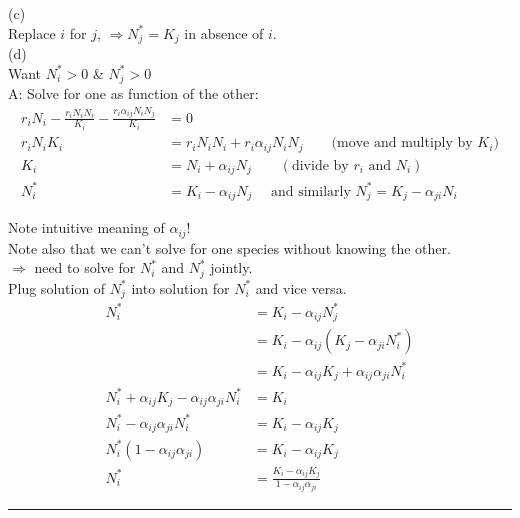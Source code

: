 \documentclass{article}
\newcommand{\ind}{\-\hspace{1cm}}
\begin{document}
(c)\\
Replace $i$ for $j$, $\Rightarrow N_j^* = K_j$ in absence of $i$.\\

(d)\\
Want $N_i^* > 0$ \&  $N_j^* > 0$\\
A: Solve for one as function of the other:\\
\begin{align*}
	r_i N_i - \frac{r_i N_i N_i}{K_i} - \frac{ r_i \alpha_{ij} N_i N_j}{K_i} & =0\\
	r_i N_i K_i & = r_i N_i N_i + r_i \alpha_{ij} N_i N_j   \quad \quad \text{(move and  multiply by }K_i)\\
	K_i & = N_i + \alpha_{ij}N_j  \quad \quad (\text{divide by } r_i \text{  and } N_i)\\[1em]
	N_i^* & = K_i - \alpha_{ij} N_j  \quad \text{ and similarly }	N_j^* = K_j - \alpha_{ji} N_i
 \end{align*}
 
Note intuitive meaning of $\alpha_{ij}$!\\
Note also that we can't solve for one species without knowing the other.\\
\ind $\Rightarrow$ need to solve for $N_i^*$ and $N_j^*$ jointly.\\
\ind Plug solution of $N_j^*$ into solution for $N_i^*$ and vice versa.
\begin{align*}
	N_i^*  & = K_i - \alpha_{ij} N_j^* \\
				& = K_i - \alpha_{ij} \left ( K_j  - \alpha_{ji} N_i^* \right )\\
				& = K_i - \alpha_{ij} K_j + \alpha_{ij}\alpha_{ji} N_i^* \\
	N_i^* + \alpha_{ij} K_j - \alpha_{ij} \alpha_{ji} N_i^* & = K_i \\
	N_i^* - \alpha_{ij} \alpha_{ji} N_i^* & = K_i - \alpha_{ij} K_j \\
	N_i^* \left (1 - \alpha_{ij} \alpha_{ji} \right)  & = K_i - \alpha_{ij} K_j \\
	N_i^* & = \frac{ K_i - \alpha_{ij} K_j  } {1-\alpha_{ij} \alpha_{ji} }
\end{align*}

\rule[0.5ex]{\linewidth}{1pt}
\end{document}

